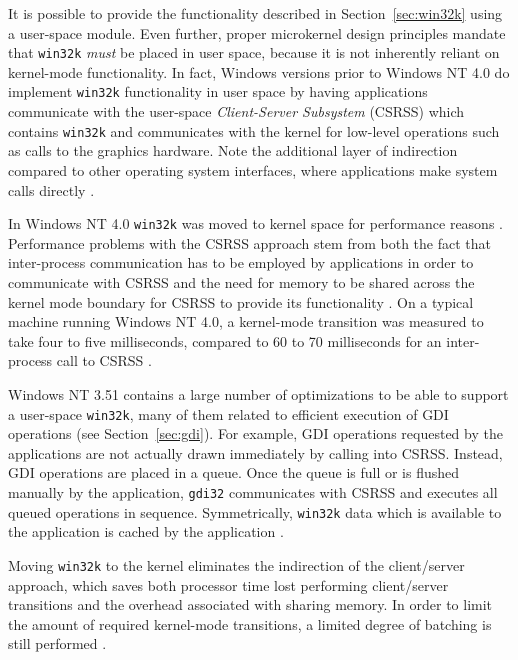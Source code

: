 			It is possible to provide the functionality described in
			Section~\ref{sec:win32k} using a user-space module. Even further,
			proper microkernel design principles mandate that \texttt{win32k}
			\emph{must} be placed in user space, because it is not inherently
			reliant on kernel-mode functionality.  In fact, Windows versions
			prior to Windows NT 4.0 do implement \texttt{win32k} functionality
			in user space by having applications communicate with the
			user-space \textit{Client-Server Subsystem} (CSRSS) which contains
			\texttt{win32k} and communicates with the kernel for low-level
			operations such as calls to the graphics hardware. Note the
			additional layer of indirection compared to other operating system
			interfaces, where applications make system calls directly
			\cite{gdikernel}.

			In Windows NT 4.0 \texttt{win32k} was moved to kernel space for
			performance reasons \cite{gdikernel}. Performance problems with the
			CSRSS approach stem from both the fact that inter-process
			communication has to be employed by applications in order to
			communicate with CSRSS and the need for memory to be shared across
			the kernel mode boundary for CSRSS to provide its functionality
			\cite{gdikernel}. On a typical machine running Windows NT 4.0, a
			kernel-mode transition was measured to take four to five
			milliseconds, compared to 60 to 70 milliseconds for an
			inter-process call to CSRSS \cite{gdikernel}.

			Windows NT 3.51 contains a large number of optimizations to be able
			to support a user-space \texttt{win32k}, many of them related to
			efficient execution of GDI operations (see Section~\ref{sec:gdi}).
			For example, GDI operations requested by the applications are not
			actually drawn immediately by calling into CSRSS. Instead, GDI
			operations are placed in a queue. Once the queue is full or is
			flushed manually by the application, \texttt{gdi32} communicates
			with CSRSS and executes all queued operations in sequence.
			Symmetrically, \texttt{win32k} data which is available to the
			application is cached by the application \cite{gdikernel}.

			Moving \texttt{win32k} to the kernel eliminates the indirection of
			the client/server approach, which saves both processor time lost
			performing client/server transitions and the overhead associated
			with sharing memory. In order to limit the amount of required
			kernel-mode transitions, a limited degree of batching is still
			performed \cite{gdikernel}.

